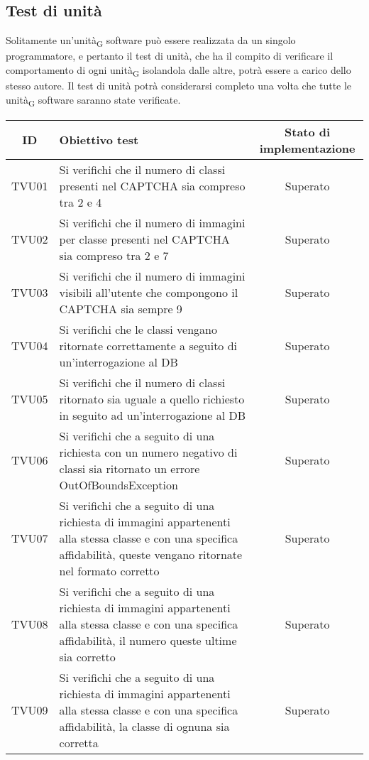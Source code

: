 \subsection{Test di unità}
Solitamente un'unità\textsubscript{G} software può essere realizzata da un singolo programmatore, e pertanto il test di unità, che ha il compito di verificare il comportamento di ogni unità\textsubscript{G} isolandola dalle altre, potrà essere a carico dello stesso autore. Il test di unità potrà considerarsi completo una volta che tutte le unità\textsubscript{G} software saranno state verificate.
\begin{center}
	\setlength\extrarowheight{5pt}
	\begin{xltabular}{\textwidth}{|c|X|c|}
		\hline
		\textbf{ID} & \textbf{Obiettivo test} & \textbf{Stato di implementazione} \\
		\hline
		TVU01 & Si verifichi che il numero di classi presenti nel CAPTCHA sia compreso tra 2 e 4 & Superato\\
		\hline
		TVU02 & Si verifichi che il numero di immagini per classe presenti nel CAPTCHA sia compreso tra 2 e 7 & Superato\\
		\hline
		TVU03 & Si verifichi che il numero di immagini visibili all'utente che compongono il CAPTCHA sia sempre 9 & Superato\\
		\hline
		TVU04 & Si verifichi che le classi vengano ritornate correttamente a seguito di un'interrogazione al DB & Superato\\
		\hline
		TVU05 & Si verifichi che il numero di classi ritornato sia uguale a quello richiesto in seguito ad un'interrogazione al DB & Superato\\
		\hline
		TVU06 & Si verifichi che a seguito di una richiesta con un numero negativo di classi sia ritornato un errore OutOfBoundsException & Superato\\
		\hline
		TVU07 & Si verifichi che a seguito di una richiesta di immagini appartenenti alla stessa classe e con una specifica affidabilità, queste vengano ritornate nel formato corretto & Superato\\
		\hline
		TVU08 &  Si verifichi che a seguito di una richiesta di immagini appartenenti alla stessa classe e con una specifica affidabilità, il numero queste ultime sia corretto & Superato\\
		\hline
		TVU09 &  Si verifichi che a seguito di una richiesta di immagini appartenenti alla stessa classe e con una specifica affidabilità, la classe di ognuna sia corretta & Superato\\

\end{xltabular}
\end{center}
